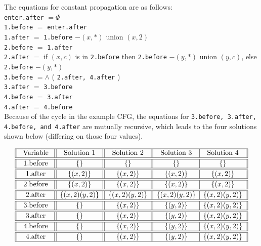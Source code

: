 The equations for constant propagation are as follows:\\
\texttt{enter.after} $= \Phi $ \\
\texttt{1.before} $=$  \texttt{enter.after} \\
\texttt{1.after} $=$ \texttt{1.before} $-(x, *)$ {\color{red} union} $(x, 2)$  \\
\texttt{2.before} $=$ \texttt{1.after} \\
\texttt{2.after} $=$ if $(x, c)$ is in  \texttt{2.before} then  \texttt{2.before} $-(y, *)$ {\color{red} union} $(y, c)$, else  \texttt{2.before} $-(y, *)$  \\
\texttt{3.before} $= \wedge $ ( \texttt{2.after, 4.after} ) \\
\texttt{3.after} $=$  \texttt{3.before} \\
\texttt{4.before} $=$  \texttt{3.after} \\
\texttt{4.after} $=$  \texttt{4.before} \\

Because of the cycle in the example CFG, the equations for  \texttt{3.before,
	3.after, 4.before, and 4.after} are mutually recursive, which leads to the
four solutions shown below (differing on those four values).

$$
	\begin{array}{||c||c||c||c|c||}
		\hline \text { Variable }        & \text { Solution 1 } & \text { Solution 2 } & \text { Solution 3 } & \text { Solution 4 } \\
		\hline \hline \text { 1.before } & \{\}                 & \{\}                 & \{\}                 & \{\}                 \\
		\hline \hline \text { 1.after }  & \{(x, 2)\}           & \{(x, 2)\}           & \{(x, 2)\}           & \{(x, 2)\}           \\
		\hline \hline \text { 2.before } & \{(x, 2)\}           & \{(x, 2)\}           & \{(x, 2)\}           & \{(x, 2)\}           \\
		\hline \hline \text { 2.after }  & \{(x, 2)(y, 2)\}     & \{(x, 2)(y, 2)\}     & \{(x, 2)(y, 2)\}     & \{(x, 2)(y, 2)\}     \\
		\hline \hline \text { 3.before } & \{\}                 & \{(x, 2)\}           & \{(y, 2)\}           & \{(x, 2)(y, 2)\}     \\
		\hline \hline \text { 3.after }  & \{\}                 & \{(x, 2)\}           & \{(y, 2)\}           & \{(x, 2)(y, 2)\}     \\
		\hline \hline \text { 4.before } & \{\}                 & \{(x, 2)\}           & \{(y, 2)\}           & \{(x, 2)(y, 2)\}     \\
		\hline \hline \text { 4.after }  & \{\}                 & \{(x, 2)\}           & \{(y, 2)\}           & \{(x, 2)(y, 2)\}     \\
		\hline
	\end{array}
$$

